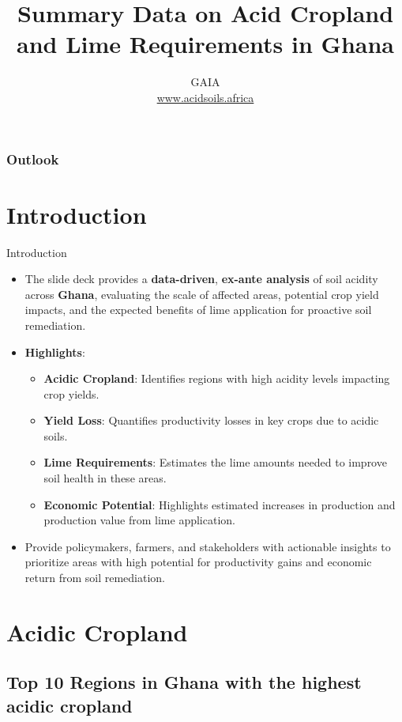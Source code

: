 \documentclass[xcolor=table, aspectratio=1610]{beamer}
\title[Ghana--Summary]{\textsf{Summary Data on Acid Cropland and Lime Requirements in Ghana}}
\author[GAIA]{GAIA\\ \href{www.acidsoils.africa}{www.acidsoils.africa} }
\institute[CIMMYT]
\begin{document}
\begin{frame}[plain]
\textsc{\titlepage}
\end{frame}

\begin{frame}
\frametitle{Outlook}
\tableofcontents 
\end{frame}

\section{Introduction}
\begin{frame}{Introduction}
    \begin{itemize}
        \item The slide deck provides a \textbf{data-driven}, \textbf{ex-ante analysis} of soil acidity across \textbf{Ghana}, evaluating the scale of affected areas, potential crop yield impacts, and the expected benefits of lime application for proactive soil remediation.
        \bigskip
        \item \textbf{Highlights}:
        \begin{itemize}
            \item \textbf{Acidic Cropland}: Identifies regions with high acidity levels impacting crop yields.
            \item \textbf{Yield Loss}: Quantifies productivity losses in key crops due to acidic soils.
            \item \textbf{Lime Requirements}: Estimates the lime amounts needed to improve soil health in these areas.
            \item \textbf{Economic Potential}: Highlights estimated increases in production and production value from lime application.
        \end{itemize}
        \bigskip
        \item Provide policymakers, farmers, and stakeholders with actionable insights to prioritize areas with high potential for productivity gains and economic return from soil remediation.
    \end{itemize}
\end{frame}
\section{Acidic Cropland}
\subsection*{Top 10 Regions in Ghana with the highest acidic cropland}
\end{document}
